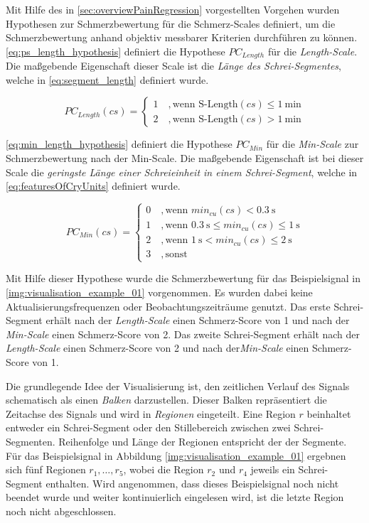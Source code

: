 Mit Hilfe des in \autoref{sec:overviewPainRegression} vorgestellten Vorgehen wurden Hypothesen zur Schmerzbewertung für die Schmerz-Scales definiert, um die Schmerzbewertung anhand objektiv messbarer Kriterien durchführen zu können. \autoref{eq:ps_length_hypothesis} definiert die Hypothese $PC_{Length}$ für die \emph{Length-Scale}. Die maßgebende Eigenschaft dieser Scale ist die \emph{Länge des Schrei-Segmentes}, welche in \autoref{eq:segment_length} definiert wurde.

\begin{equation}
PC_{Length}(cs) = \begin{cases}
 1 \quad ,  \text{wenn } \text{S-Length}(cs) \leq \SI{1}{\minute} \\
 2 \quad ,  \text{wenn } \text{S-Length}(cs) > \SI{1}{\minute}
 \end{cases}	
 \label{eq:ps_length_hypothesis}
\end{equation}

\autoref{eq:min_length_hypothesis} definiert die Hypothese $PC_{Min}$ für die \emph{Min-Scale} zur Schmerzbewertung nach der \glqq Min-Scale\grqq. Die maßgebende Eigenschaft ist bei dieser Scale die \emph{geringste Länge einer Schreieinheit in einem Schrei-Segment}, welche in \autoref{eq:featuresOfCryUnits} definiert wurde.

\begin{equation}
PC_{Min}(cs) = \begin{cases}
 0 \quad ,  \text{wenn } min_{cu}(cs) < \SI{0.3}{\second}\\
 1 \quad ,  \text{wenn } \SI{0.3}{\second} \leq min_{cu}(cs) \leq \SI{1}{\second}\\
 2 \quad ,  \text{wenn } \SI{1}{\second} < min_{cu}(cs) \leq \SI{2}{\second} \\
 3 \quad , \text{sonst }
 \end{cases}	
 \label{eq:min_length_hypothesis}
\end{equation}

Mit Hilfe dieser Hypothese wurde die Schmerzbewertung für das Beispielsignal in \autoref{img:visualisation_example_01} vorgenommen. Es wurden dabei keine Aktualisierungsfrequenzen oder Beobachtungszeiträume genutzt. Das erste Schrei-Segment erhält nach der \emph{Length-Scale} einen Schmerz-Score von 1 und nach der \emph{Min-Scale} einen Schmerz-Score von 2. Das zweite Schrei-Segment erhält nach der \emph{Length-Scale} einen Schmerz-Score von 2 und nach der\emph{Min-Scale} einen Schmerz-Score von 1.

Die grundlegende Idee der Visualisierung ist, den zeitlichen Verlauf des Signals schematisch als einen \emph{Balken} darzustellen. Dieser Balken repräsentiert die Zeitachse des Signals und wird in \emph{Regionen} eingeteilt. Eine Region $r$ beinhaltet entweder ein Schrei-Segment oder den Stillebereich zwischen zwei Schrei-Segmenten. Reihenfolge und Länge der Regionen entspricht der der Segmente. Für das Beispielsignal in Abbildung \ref{img:visualisation_example_01} ergebnen sich fünf Regionen $r_{1} , \ldots , r_5 $, wobei die Region $r_2$ und $r_4$ jeweils ein Schrei-Segment enthalten. Wird angenommen, dass dieses Beispielsignal noch nicht beendet wurde und weiter kontinuierlich eingelesen wird, ist die letzte Region noch nicht abgeschlossen.

